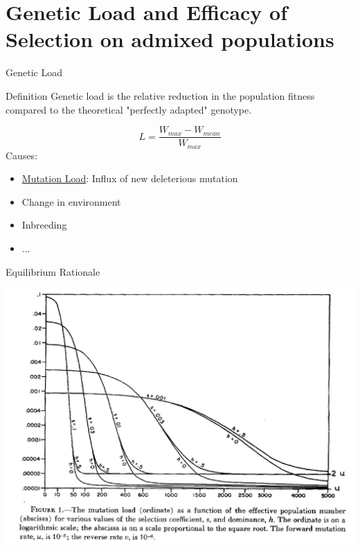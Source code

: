 \documentclass[10pt]{beamer}
\begin{document}
\section{Genetic Load and Efficacy of Selection on admixed populations}

\begin{frame}{Genetic Load}
  \begin{alertblock}{Definition}
    Genetic load is the relative reduction in the population fitness compared
    to the theoretical "perfectly adapted" genotype.
  \end{alertblock}
  \[
    L = \frac{W_{max} - W_{mean}}{W_{max}}
  \]
  Causes:
  \begin{itemize}
    \item \underline{Mutation Load}: Influx of new deleterious mutation
    \item Change in environment
    \item Inbreeding 
    \item ...
  \end{itemize}
\end{frame}

\begin{frame}{Equilibrium Rationale}
\begin{minipage}{0.7\textwidth}
  \includegraphics[width=\textwidth]{./Figures/Kimura_1963.png}
\end{minipage}
\end{frame}
\end{document}
